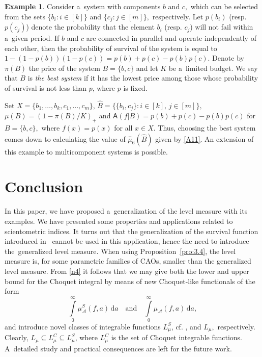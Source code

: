 \documentclass[preprint,11pt]{elsarticle}
\theoremstyle{definition}
\newtheorem{example}[tw]{Example}
\newcommand\sA{\mathsf{A}}
\newcommand\bA{\mathscr{A}}%
\newcommand\mub[1][\bA]{\mu_{#1}}
\newcommand\md{\,{\mathrm{d}}}
\newcommand\intl{\int\limits}
\begin{document}
\begin{example}
Consider a~system with components $b$ and $c,$ which can be selected from the sets $\{b_i\colon i\in [k]\}$ and $\{c_j\colon j\in [m]\},$ respectively.
Let $p(b_i)$  (resp. $p(c_j)$)  denote  the probability that the element $b_i$ (resp. $c_j$)  will not fail within a~given period.
If  $b$ and $c$  are connected in parallel and operate independently of each other, then the probability of survival of the system  is equal to $1-(1-p(b))(1-p(c))=p(b)+p(c)-p(b)p(c).$
Denote by $\pi(B)$ the price of the system $B=\{b,c\}$ and let $K$ be a~limited budget.
We say that $B$ is \textit{the best system} if it has the lowest
price among those whose probability of survival is not less than $p$, where $p$ is fixed.

Set $X=\{b_1,\ldots,b_k,c_1,\ldots,c_m\}$, $\widehat{B}=\{\{b_i,c_j\}\colon i\in [k],\,j\in [m]\},$
$\mu(B)=(1-\pi(B)/K)_+$ and $\sA(f|B)=p(b)+p(c)-p(b)p(c)$ for $B=\{b,c\},$ where $f(x)=p(x)$ for all $x\in X.$
Thus, choosing the best system comes down to calculating the value of $\widehat{\mu}_6(\widehat{B})$ given by \eqref{A11}.
An extension of this example to multicomponent systems is possible.
\end{example}



\section{Conclusion}

In this paper, we have proposed a~generalization of the level measure with its examples. We have presented some properties and applications related to scientometric indices. It turns out that the generalization of the survival function introduced in~\cite{BHHK21} cannot be used in this application, hence the need to introduce the~generalized level measure. When using Proposition~\ref{pro:3.4}, the level measure is, for some parametric families of CAOs, smaller than the generalized level measure.
From \eqref{n4} it follows that we may  give both  the lower and upper bound for the Choquet integral by means of new Choquet-like  functionals of the form
$$
\intl_0^\infty \mub^S(f,a)\md a\quad \text{and}\quad \intl_0^\infty \mub(f,a)\md a,
$$
and introduce novel classes of integrable functions $L_{\mu}^S$, cf. \cite{BHHK21}, and $L_{\mu},$ respectively. Clearly, $L_{\mu}\subseteq L_{\mu}^C\subseteq L_{\mu}^S$, where
$L^C_\mu$ is the set of Choquet integrable functions. A~detailed study and practical consequences are left for the future work.
\end{document}

